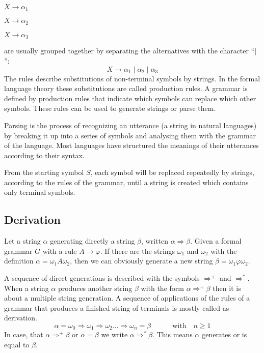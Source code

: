 $X \rightarrow \alpha_1$

$X \rightarrow \alpha_2$

$X \rightarrow \alpha_3$

are usually grouped together by separating the alternatives with the character ``$\mid$'':
$$X \rightarrow \alpha_1 \mid \alpha_2 \mid \alpha_3$$
The rules describe substitutions of non-terminal symbols by strings. In the formal language theory these substitutions are called production rules. A grammar is defined by production rules that indicate which symbols can replace which other symbols. These rules can be used to generate strings or parse them.

Parsing is the process of recognizing an utterance (a string in natural languages) by breaking it up into a series of symbols and analysing them with the grammar of the language. Most languages have structured the meanings of their utterances according to their syntax.

From the starting symbol $S$, each symbol will be replaced repeatedly by strings, according to the rules of the grammar, until a string is created which contains only terminal symbols.

\subsection{Derivation}
Let a string $\alpha$ generating directly a string $\beta$, written $\alpha \Rightarrow \beta$. Given a formal grammar $G$ with a rule $A \rightarrow \varphi$. If there are the strings $\omega_1$ and $\omega_2$ with the definition $\alpha = \omega_1A\omega_2$, then we can obviously generate a new string $\beta = \omega_1\varphi\omega_2$.
 
A sequence of direct generations is described with the symbols $\Rightarrow^+$ and $\Rightarrow^*$. When a string $\alpha$ produces another string $\beta$ with the form $\alpha \Rightarrow^+ \beta$ then it is about a multiple string generation. A sequence of applications of the rules of a grammar that produces a finished string of terminals is mostly called as derivation. 
$$\alpha = \omega_0 \Rightarrow \omega_1 \Rightarrow \omega_2 \ldots \Rightarrow \omega_n = \beta \qquad \quad \textrm{with} \quad n \geq 1$$ 
In case, that $\alpha \Rightarrow^+ \beta$ or $\alpha = \beta$ we write $\alpha \Rightarrow^* \beta$. This means $\alpha$ generates or is equal to $\beta$.

